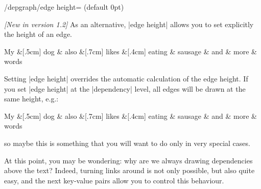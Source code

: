\documentclass[a4paper]{ltxdoc}
\begin{document}
\begin{key}{/depgraph/edge height= (default 0pt)}

   \textit{[New in version 1.2]}
   As an alternative, |edge height| allows you to set explicitly the height of an edge.

\begin{codeexample}[]
\begin{dependency}
   \begin{deptext}[column sep=0.2cm]
      My \&[.5cm] dog \& also \&[.7cm] likes \&[.4cm] eating \& sausage \& and \& more \& words \\
   \end{deptext}
\end{dependency}
\end{codeexample}

Setting |edge height| overrides the automatic calculation of the edge height. If you set |edge height| at the |dependency| level, all edges will be drawn at the same height, e.g.:

\begin{codeexample}[]
\begin{dependency}[edge height=2cm]
   \begin{deptext}[column sep=0.2cm]
      My \&[.5cm] dog \& also \&[.7cm] likes \&[.4cm] eating \& sausage \& and \& more \& words \\
   \end{deptext}
\end{dependency}
\end{codeexample}

\noindent so maybe this is something that you will want to do only in very special cases.

\end{key}

At this point, you may be wondering: why are we always drawing dependencies above the text? Indeed, turning links around is not only possible, but also quite easy, and the next key-value pairs allow you to control this behaviour.
\end{document}
